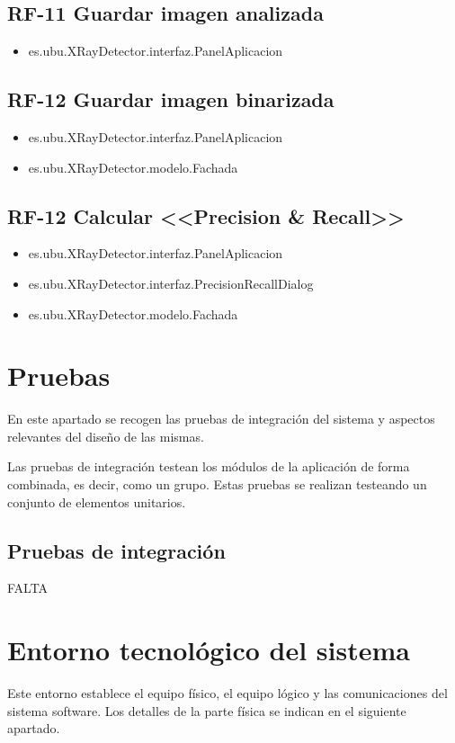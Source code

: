 \subsection{RF-11 Guardar imagen analizada}
\begin{itemize}
\item[] es.ubu.XRayDetector.interfaz.PanelAplicacion
\end{itemize}

\subsection{RF-12 Guardar imagen binarizada}
\begin{itemize}
\item[] es.ubu.XRayDetector.interfaz.PanelAplicacion
\item[] es.ubu.XRayDetector.modelo.Fachada
\end{itemize}

\subsection{RF-12 Calcular <<Precision \& Recall>>}
\begin{itemize}
\item[] es.ubu.XRayDetector.interfaz.PanelAplicacion
\item[] es.ubu.XRayDetector.interfaz.PrecisionRecallDialog
\item[] es.ubu.XRayDetector.modelo.Fachada
\end{itemize}

\section{Pruebas}
En este apartado se recogen las pruebas de integración del sistema y aspectos relevantes del diseño de las mismas.

Las pruebas de integración testean los módulos de la aplicación de forma combinada, es decir, como un grupo. Estas pruebas se realizan testeando un conjunto de elementos unitarios.

\subsection{Pruebas de integración}
FALTA

\newpage

\section{Entorno tecnológico del sistema}
Este entorno establece el equipo físico, el equipo lógico y las comunicaciones del sistema software. Los detalles de la parte física se indican en el siguiente apartado.

